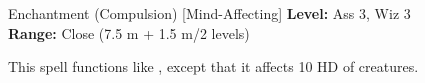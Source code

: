 {Enchantment (Compulsion) [Mind-Affecting]}
{
	\textbf{Level:}
	Ass 3, Wiz 3\\
	\textbf{Range:}
	Close (7.5 m + 1.5 m/2 levels)\\
}
{
	This spell functions like , except that it affects 10 HD of creatures.

}
